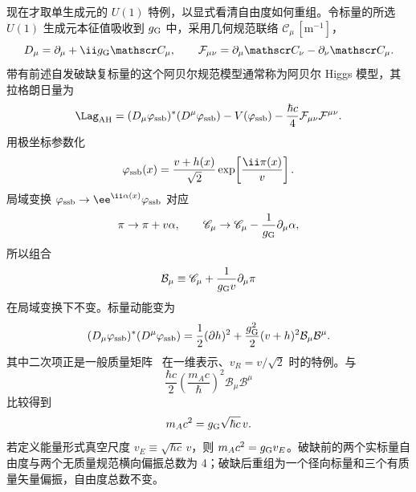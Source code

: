 现在才取单生成元的 $U(1)$ 特例，以显式看清自由度如何重组。令标量的所选 $U(1)$ 生成元本征值吸收到 $g_{\rm G}$ 中，采用几何规范联络 $\mathscr C_\mu\,[\mathrm{m^{-1}}]$，
\begin{equation*}
 D_\mu=\partial_\mu+\ii g_{\rm G}\mathscr C_\mu,
 \qquad
 \mathcal F_{\mu\nu}
 =\partial_\mu\mathscr C_\nu-\partial_\nu\mathscr C_\mu.
\end{equation*}
带有前述自发破缺复标量的这个阿贝尔规范模型通常称为阿贝尔 Higgs 模型，其拉格朗日量为
\begin{equation}
 \Lag_{\rm AH}
 =(D_\mu\varphi_{\rm ssb})^*(D^\mu\varphi_{\rm ssb})-V(\varphi_{\rm ssb})
 -\frac{\hbar c}{4}\mathcal F_{\mu\nu}\mathcal F^{\mu\nu}.
 \label{eq:abelian-higgs-lag-dp11}
\end{equation}
用极坐标参数化
\begin{equation}
 \varphi_{\rm ssb}(x)=\frac{v+h(x)}{\sqrt2}
 \exp\!\left[\frac{\ii\pi(x)}{v}\right].
 \label{eq:abelian-higgs-polar-dp11}
\end{equation}
局域变换 $\varphi_{\rm ssb}\to \ee^{\ii\alpha(x)}\varphi_{\rm ssb}$ 对应
\begin{equation*}
 \pi\to\pi+v\alpha,
 \qquad
 \mathscr C_\mu\to\mathscr C_\mu-\frac1{g_{\rm G}}\partial_\mu\alpha,
\end{equation*}
所以组合
\begin{equation}
 {
 \mathcal B_\mu
 \equiv\mathscr C_\mu+\frac1{g_{\rm G}v}\partial_\mu\pi}
 \label{eq:gauge-invariant-massive-vector-dp11}
\end{equation}
在局域变换下不变。标量动能变为
\begin{equation}
 (D_\mu\varphi_{\rm ssb})^*(D^\mu\varphi_{\rm ssb})
 =\frac12(\partial h)^2
 +\frac{g_{\rm G}^2}{2}(v+h)^2\mathcal B_\mu\mathcal B^\mu.
 \label{eq:abelian-higgs-kinetic-expanded-dp11}
\end{equation}
其中二次项正是一般质量矩阵~ 在一维表示、$v_R=v/\sqrt2$ 时的特例。与
\[
 \frac{\hbar c}{2}
 \left(\frac{m_Ac}{\hbar}\right)^2
 \mathcal B_\mu\mathcal B^\mu
\]
比较得到
\begin{equation}
 {m_Ac^2=g_{\rm G}\sqrt{\hbar c}\,v.}
 \label{eq:abelian-higgs-vector-mass-dp11}
\end{equation}
若定义能量形式真空尺度 $v_E\equiv\sqrt{\hbar c}\,v$，则 $m_Ac^2=g_{\rm G}v_E$。破缺前的两个实标量自由度与两个无质量规范横向偏振总数为 4；破缺后重组为一个径向标量和三个有质量矢量偏振，自由度总数不变。

